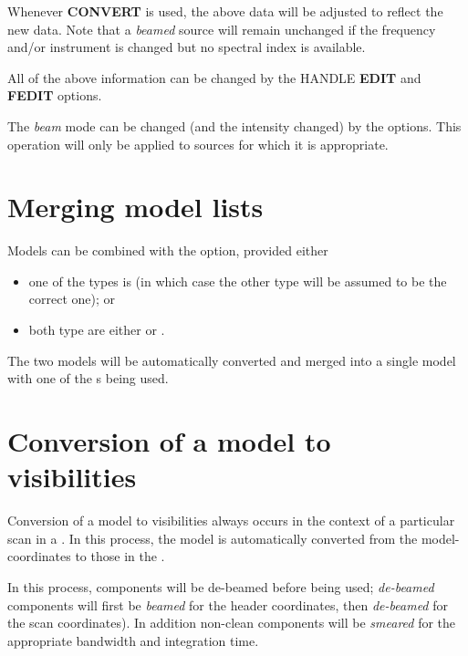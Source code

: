 	Whenever  {\bf CONVERT} is used,
the above data will be adjusted to reflect the new \header data.  Note
that a {\em beamed} source will remain unchanged if the frequency and/or
instrument is changed but no spectral index is available. 

	All of the above information can be changed by the \NMODEL
HANDLE {\bf EDIT} and {\bf FEDIT} options. 

	The {\em beam} mode can be changed (and the intensity changed)
by the  options.  This operation will only be
applied to sources for which it is appropriate. 


\section{ Merging model lists}
\label{.merge.lists}

	Models can be combined with the  option,
provided either 

\begin{itemize}

\item one of the types is \local (in which case the other type will be
assumed to be the correct one); or

\item both type are either \apparent or \epoch.  \end{itemize}

	The two models will be automatically converted and merged into a
single model with one of the {\header}s being used. 


\section{ Conversion of a model to visibilities}
\label{.model.to.vis}

	Conversion of a model to visibilities always occurs in the
context of a particular scan in a .  In
this process, the model is automatically converted from the
model-\header coordinates to those in the . 

	In this process,  \source
components will be de-beamed before being used; {\em de-beamed}
components will first be {\em beamed} for the header coordinates, then
{\em de-beamed} for the scan coordinates).  In addition non-clean
components will be {\em smeared} for the appropriate bandwidth and
integration time. 

